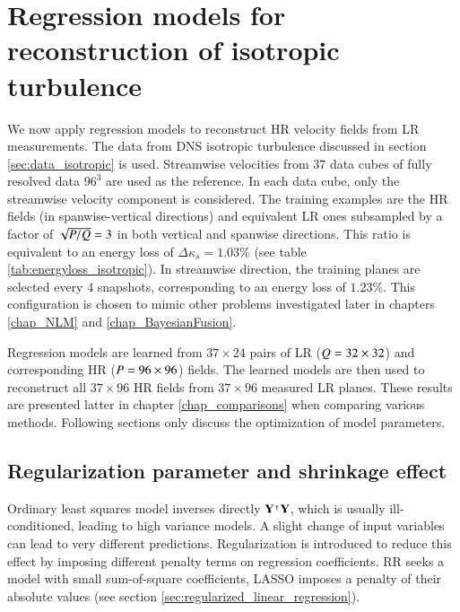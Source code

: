 \section{Regression models for reconstruction of isotropic turbulence}
We now apply regression models to reconstruct HR velocity fields from LR measurements. The data from DNS isotropic turbulence discussed in section \ref{sec:data_isotropic} is used. Streamwise velocities from $ 37 $ data cubes of fully resolved data $ 96^3 $ are used as the reference. In each data cube, only the streamwise velocity component is considered. The training examples are the HR fields (in spanwise-vertical directions) and equivalent LR ones subsampled by a factor of $ \sqrt{P/Q} = 3 $ in both vertical and spanwise directions. This ratio is equivalent to an energy loss of $ \Delta \kappa_s = 1.03 \% $ (see table \ref{tab:energyloss_isotropic}). In streamwise direction, the training planes are selected every 4 snapshots, corresponding to an energy loss of $ 1.23 \% $. This configuration is chosen to mimic other problems investigated later in chapters \ref{chap_NLM} and \ref{chap_BayesianFusion}. 

Regression models are learned from $ 37 \times 24 $ pairs of LR ($ Q = 32 \times 32 $) and corresponding HR ($P = 96 \times 96 $) fields. The learned models are then used to reconstruct all $ 37 \times 96 $ HR fields from $ 37 \times 96 $ measured LR planes. These results are presented latter in chapter \ref{chap_comparisons} when comparing various methods. Following sections only discuss the optimization of model parameters.

\subsection{Regularization parameter and shrinkage effect}
Ordinary least squares model inverses directly $ \mathbf{Y}^{\intercal}\mathbf{Y} $, which is usually ill-conditioned, leading to high variance models. A slight change of input variables can lead to very different predictions. Regularization is introduced to reduce this effect by imposing different penalty terms on regression coefficients. RR seeks a model with small sum-of-square coefficients, LASSO imposes a penalty of their absolute values (see section \ref{sec:regularized_linear_regression}). 

